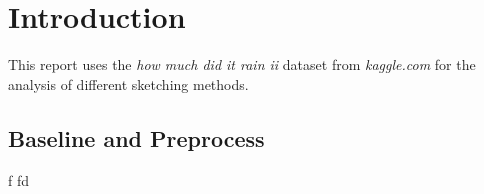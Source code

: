 \section{Introduction}
\label{sec:intro}

This report uses the \emph{how much did it rain ii} \cite{rain, Lakshmanan16}
dataset from \emph{kaggle.com} for the analysis of different sketching methods.

\subsection{Baseline and Preprocess}
f
fd
